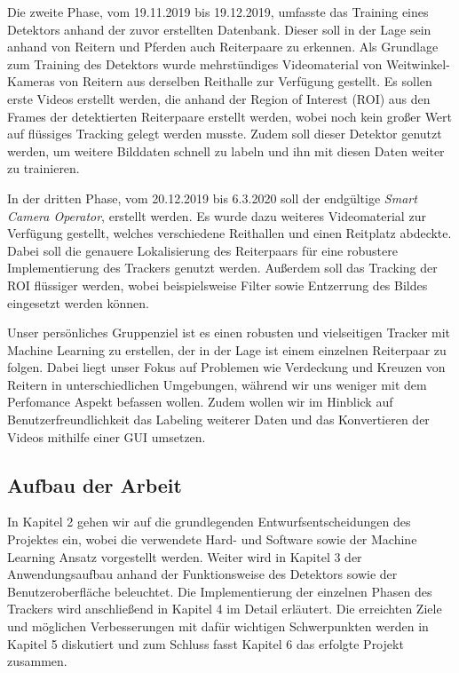 Die zweite Phase, vom 19.11.2019 bis 19.12.2019, umfasste das Training eines Detektors anhand der zuvor erstellten Datenbank. Dieser soll in der Lage sein anhand von Reitern und Pferden auch Reiterpaare zu erkennen. Als Grundlage zum Training des Detektors wurde mehrstündiges Videomaterial von Weitwinkel-Kameras von Reitern aus derselben Reithalle zur Verfügung gestellt. Es sollen erste Videos erstellt werden, die anhand der Region of Interest (ROI) aus den Frames der detektierten Reiterpaare erstellt werden, wobei noch kein großer Wert auf flüssiges Tracking gelegt werden musste. Zudem soll dieser Detektor genutzt werden, um weitere Bilddaten schnell zu labeln und ihn mit diesen Daten weiter zu trainieren.

In der dritten Phase, vom 20.12.2019 bis 6.3.2020 soll der endgültige \emph{Smart Camera Operator},  erstellt werden. Es wurde dazu weiteres Videomaterial zur Verfügung gestellt, welches verschiedene Reithallen und einen Reitplatz abdeckte. Dabei soll die genauere Lokalisierung des Reiterpaars für eine robustere Implementierung des Trackers genutzt werden. Außerdem soll das Tracking der ROI flüssiger werden, wobei beispielsweise Filter sowie Entzerrung des Bildes eingesetzt werden können.

Unser persönliches Gruppenziel ist es einen robusten und vielseitigen Tracker mit Machine Learning zu erstellen, der in der Lage ist einem einzelnen Reiterpaar zu folgen. Dabei liegt unser Fokus auf Problemen wie Verdeckung und Kreuzen von Reitern in unterschiedlichen Umgebungen, während wir uns weniger mit dem Perfomance Aspekt befassen wollen. Zudem wollen wir im Hinblick auf Benutzerfreundlichkeit das Labeling weiterer Daten und das Konvertieren der Videos mithilfe einer GUI umsetzen.




\subsection*{Aufbau der Arbeit}
In Kapitel 2 gehen wir auf die grundlegenden Entwurfsentscheidungen des Projektes ein, wobei die verwendete Hard- und Software sowie der Machine Learning Ansatz vorgestellt werden. Weiter wird in Kapitel 3 der Anwendungsaufbau anhand der Funktionsweise des Detektors sowie der Benutzeroberfläche beleuchtet. Die Implementierung der einzelnen Phasen des Trackers wird anschließend in Kapitel 4 im Detail erläutert. Die erreichten Ziele und möglichen Verbesserungen mit dafür wichtigen Schwerpunkten werden in Kapitel 5 diskutiert und zum Schluss fasst Kapitel 6 das erfolgte Projekt zusammen.